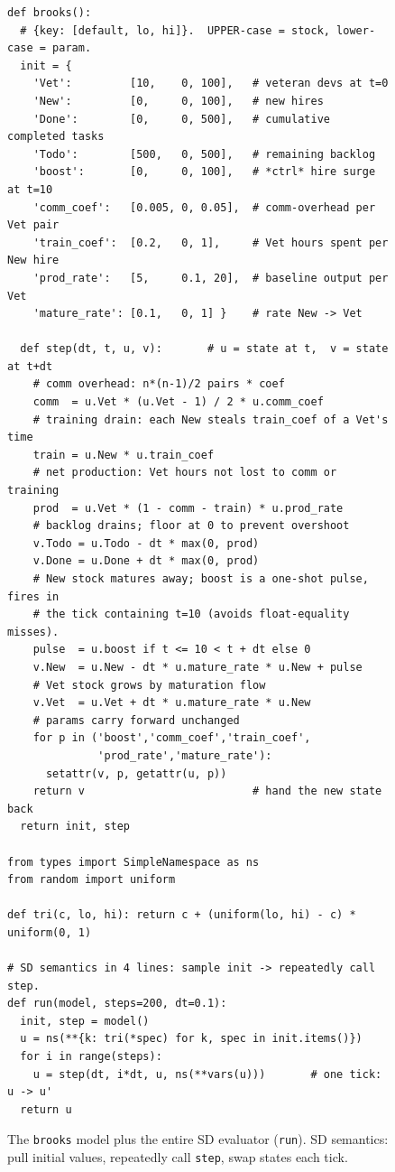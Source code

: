 \documentclass[10pt,conference]{IEEEtran}
\begin{document}
\begin{figure}[t]
\begin{lstlisting}[style=py]
def brooks():
  # {key: [default, lo, hi]}.  UPPER-case = stock, lower-case = param.
  init = {
    'Vet':         [10,    0, 100],   # veteran devs at t=0
    'New':         [0,     0, 100],   # new hires
    'Done':        [0,     0, 500],   # cumulative completed tasks
    'Todo':        [500,   0, 500],   # remaining backlog
    'boost':       [0,     0, 100],   # *ctrl* hire surge at t=10
    'comm_coef':   [0.005, 0, 0.05],  # comm-overhead per Vet pair
    'train_coef':  [0.2,   0, 1],     # Vet hours spent per New hire
    'prod_rate':   [5,     0.1, 20],  # baseline output per Vet
    'mature_rate': [0.1,   0, 1] }    # rate New -> Vet

  def step(dt, t, u, v):       # u = state at t,  v = state at t+dt
    # comm overhead: n*(n-1)/2 pairs * coef
    comm  = u.Vet * (u.Vet - 1) / 2 * u.comm_coef
    # training drain: each New steals train_coef of a Vet's time
    train = u.New * u.train_coef
    # net production: Vet hours not lost to comm or training
    prod  = u.Vet * (1 - comm - train) * u.prod_rate
    # backlog drains; floor at 0 to prevent overshoot
    v.Todo = u.Todo - dt * max(0, prod)
    v.Done = u.Done + dt * max(0, prod)
    # New stock matures away; boost is a one-shot pulse, fires in
    # the tick containing t=10 (avoids float-equality misses).
    pulse  = u.boost if t <= 10 < t + dt else 0
    v.New  = u.New - dt * u.mature_rate * u.New + pulse
    # Vet stock grows by maturation flow
    v.Vet  = u.Vet + dt * u.mature_rate * u.New
    # params carry forward unchanged
    for p in ('boost','comm_coef','train_coef',
              'prod_rate','mature_rate'):
      setattr(v, p, getattr(u, p))
    return v                          # hand the new state back
  return init, step

from types import SimpleNamespace as ns
from random import uniform

def tri(c, lo, hi): return c + (uniform(lo, hi) - c) * uniform(0, 1)

# SD semantics in 4 lines: sample init -> repeatedly call step.
def run(model, steps=200, dt=0.1):
  init, step = model()
  u = ns(**{k: tri(*spec) for k, spec in init.items()})
  for i in range(steps):
    u = step(dt, i*dt, u, ns(**vars(u)))       # one tick: u -> u'
  return u
\end{lstlisting}
\caption{The \texttt{brooks} model plus the entire SD evaluator
(\texttt{run}). SD semantics: pull initial values, repeatedly call
\texttt{step}, swap states each tick.}
\label{lst:brooks}
\end{figure}
\end{document}
